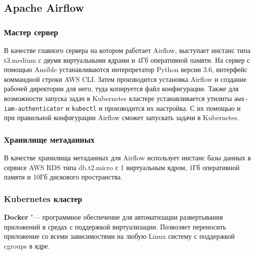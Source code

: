 \documentclass[bachelor, och, pract]{SCWorks}
\begin{document}
\subsection{Apache Airflow}
\subsubsection{Мастер сервер}
В качестве главного сервера на котором работает Airflow, выступает инстанс типа t3.medium с двумя виртуальными ядрами и 4Гб оперативной памяти. На сервер с помощью Ansible устанавливаются интерпретатор Python версии 3.6, интерфейс коммандной строки AWS CLI. Затем производится установка Airflow и создание рабочей директории для него, туда копируется файл конфигурации.
Также для возможности запуска задач в Kubernetes кластере устанавливается утилиты \verb|aws-iam-authenticator| и \verb|kubectl| и  производится их настройка. С их помощью и при правильной конфигурации Airflow сможет запускать задачи в Kubernetes.

\subsubsection{Хранилище метаданных}
В качестве хранилища метаданных для Airflow использует инстанс базы данных в сервисе AWS RDS типа db.t2.micro с 1 виртуальным ядром, 1Гб оперативной памяти и 10Гб дискового пространства.

\subsubsection{Kubernetes кластер}
\textbf{Docker} "--- программное обеспечение для автоматизации развертывания приложений в средах с поддержкой виртуализации. Позволяет переносить приложение со всеми зависимостями на любую Linux систему с поддержкой cgroups в ядре.
\end{document}

